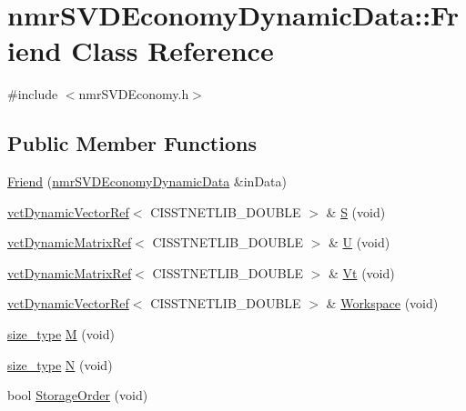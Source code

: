 \hypertarget{classnmr_s_v_d_economy_dynamic_data_1_1_friend}{}\section{nmr\+S\+V\+D\+Economy\+Dynamic\+Data\+:\+:Friend Class Reference}
\label{classnmr_s_v_d_economy_dynamic_data_1_1_friend}


{\ttfamily \#include $<$nmr\+S\+V\+D\+Economy.\+h$>$}

\subsection*{Public Member Functions}
\begin{DoxyCompactItemize}
\item 
\hyperlink{classnmr_s_v_d_economy_dynamic_data_1_1_friend_ae9bb97c429958aa00c1153b258f29f2e}{Friend} (\hyperlink{classnmr_s_v_d_economy_dynamic_data}{nmr\+S\+V\+D\+Economy\+Dynamic\+Data} \&in\+Data)
\item 
\hyperlink{classvct_dynamic_vector_ref}{vct\+Dynamic\+Vector\+Ref}$<$ C\+I\+S\+S\+T\+N\+E\+T\+L\+I\+B\+\_\+\+D\+O\+U\+B\+L\+E $>$ \& \hyperlink{classnmr_s_v_d_economy_dynamic_data_1_1_friend_a6656be64eb3abd43143fb22c21add478}{S} (void)
\item 
\hyperlink{classvct_dynamic_matrix_ref}{vct\+Dynamic\+Matrix\+Ref}$<$ C\+I\+S\+S\+T\+N\+E\+T\+L\+I\+B\+\_\+\+D\+O\+U\+B\+L\+E $>$ \& \hyperlink{classnmr_s_v_d_economy_dynamic_data_1_1_friend_a2bbae77f753e5437a1a117c49eb63222}{U} (void)
\item 
\hyperlink{classvct_dynamic_matrix_ref}{vct\+Dynamic\+Matrix\+Ref}$<$ C\+I\+S\+S\+T\+N\+E\+T\+L\+I\+B\+\_\+\+D\+O\+U\+B\+L\+E $>$ \& \hyperlink{classnmr_s_v_d_economy_dynamic_data_1_1_friend_a09bced2587257abf09f44849bfffd8da}{Vt} (void)
\item 
\hyperlink{classvct_dynamic_vector_ref}{vct\+Dynamic\+Vector\+Ref}$<$ C\+I\+S\+S\+T\+N\+E\+T\+L\+I\+B\+\_\+\+D\+O\+U\+B\+L\+E $>$ \& \hyperlink{classnmr_s_v_d_economy_dynamic_data_1_1_friend_a68bcb9bae56f1e8718d7a9e79c5f86cb}{Workspace} (void)
\item 
\hyperlink{classnmr_s_v_d_economy_dynamic_data_aee8ff15f2e92af24fdc3c7f5908770f3}{size\+\_\+type} \hyperlink{classnmr_s_v_d_economy_dynamic_data_1_1_friend_a255990ebed03b6ba23c4f95d50d25f2a}{M} (void)
\item 
\hyperlink{classnmr_s_v_d_economy_dynamic_data_aee8ff15f2e92af24fdc3c7f5908770f3}{size\+\_\+type} \hyperlink{classnmr_s_v_d_economy_dynamic_data_1_1_friend_af6645fd4d5781b66130b3ee3647f7e60}{N} (void)
\item 
bool \hyperlink{classnmr_s_v_d_economy_dynamic_data_1_1_friend_a6b01f286963a7dad4690beb9e4a91fca}{Storage\+Order} (void)
\end{DoxyCompactItemize}


